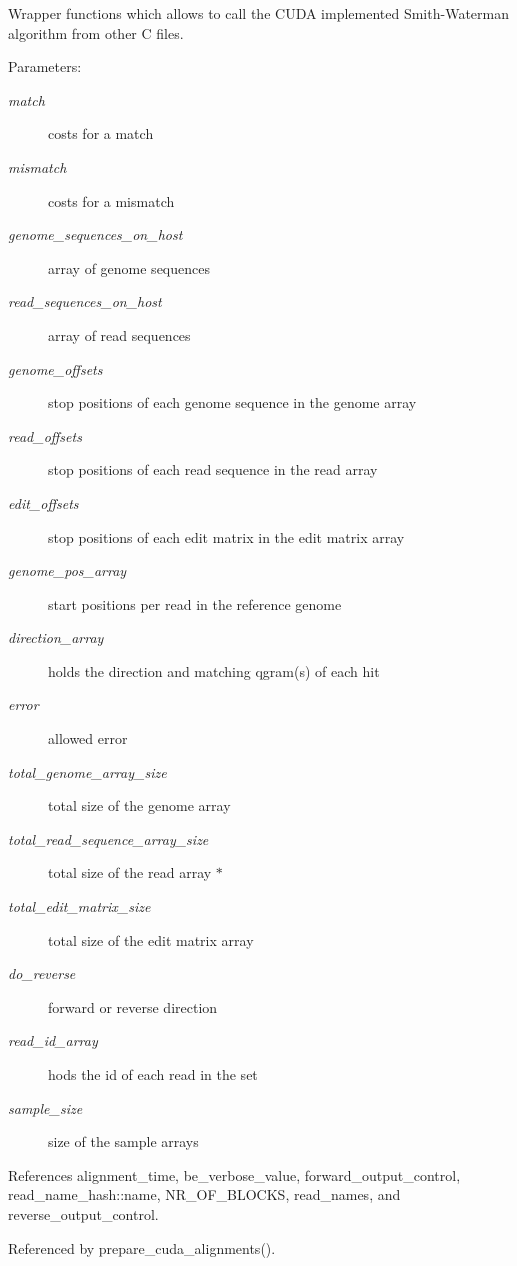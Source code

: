 Wrapper functions which allows to call the CUDA implemented Smith-Waterman algorithm from other C files. \begin{Desc}
\item[Parameters:]
\begin{description}
\item[{\em match}]costs for a match \item[{\em mismatch}]costs for a mismatch \item[{\em genome\_\-sequences\_\-on\_\-host}]array of genome sequences \item[{\em read\_\-sequences\_\-on\_\-host}]array of read sequences \item[{\em genome\_\-offsets}]stop positions of each genome sequence in the genome array \item[{\em read\_\-offsets}]stop positions of each read sequence in the read array \item[{\em edit\_\-offsets}]stop positions of each edit matrix in the edit matrix array \item[{\em genome\_\-pos\_\-array}]start positions per read in the reference genome \item[{\em direction\_\-array}]holds the direction and matching qgram(s) of each hit \item[{\em error}]allowed error \item[{\em total\_\-genome\_\-array\_\-size}]total size of the genome array \item[{\em total\_\-read\_\-sequence\_\-array\_\-size}]total size of the read array $\ast$ \item[{\em total\_\-edit\_\-matrix\_\-size}]total size of the edit matrix array \item[{\em do\_\-reverse}]forward or reverse direction \item[{\em read\_\-id\_\-array}]hods the id of each read in the set \item[{\em sample\_\-size}]size of the sample arrays \end{description}
\end{Desc}


References alignment\_\-time, be\_\-verbose\_\-value, forward\_\-output\_\-control, read\_\-name\_\-hash::name, NR\_\-OF\_\-BLOCKS, read\_\-names, and reverse\_\-output\_\-control.

Referenced by prepare\_\-cuda\_\-alignments().
